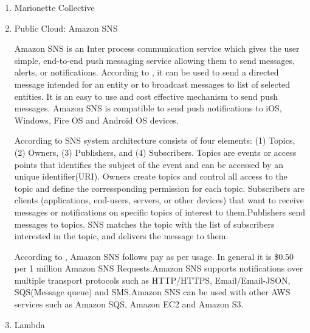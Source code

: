 \begin{enumerate}
\item {} 
Marionette Collective

\item {} 
Public Cloud: Amazon SNS

Amazon SNS is an Inter process communication service which gives
the user simple, end-to-end push messaging service allowing them
to send messages, alerts, or notifications. According to
\label{\detokenize{i524/technologies:id327}}{\hyperref[\detokenize{i524/technologies:www-sns}]{\sphinxcrossref{{[}278{]}}}}, it can be used to send a directed message
intended for an entity or to broadcast messages to list of
selected entities. It is an easy to use and cost effective
mechanism to send push messages. Amazon SNS is compatible to send
push notifications to iOS, Windows, Fire OS and Android OS
devices.

According to \label{\detokenize{i524/technologies:id328}}{\hyperref[\detokenize{i524/technologies:sns-blog}]{\sphinxcrossref{{[}279{]}}}} SNS system architecture consists
of four elements: (1) Topics, (2) Owners, (3) Publishers, and
(4) Subscribers. Topics are events or access points that identifies
the subject of the event and can be accessed by an unique
identifier(URI). Owners create topics and control all access to
the topic and define the corressponding permission for each
topic. Subscribers are clients (applications, end-users,
servers, or other devices) that want to receive messages or
notifications on specific topics of interest to them.Publishers
send messages to topics. SNS matches the topic with the list of
subscribers interested in the topic, and delivers the message to
them.

According to \label{\detokenize{i524/technologies:id329}}{\hyperref[\detokenize{i524/technologies:sns-faq}]{\sphinxcrossref{{[}280{]}}}}, Amazon SNS follows pay as per
usage. In general it is \$0.50 per 1 million Amazon SNS
Requests.Amazon SNS supports notifications over multiple
transport protocols such as HTTP/HTTPS, Email/Email-JSON,
SQS(Message queue) and SMS.Amazon SNS can be used with other AWS
services such as Amazon SQS, Amazon EC2 and Amazon S3.

\item {} 
Lambda


\end{enumerate}
